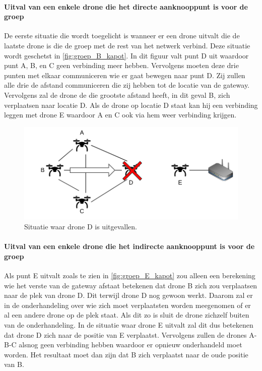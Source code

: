 \documentclass[a4paper, 11pt, oneside]{report}
\begin{document}
\paragraph{Uitval van een enkele drone die het directe aanknooppunt is voor de groep}
De eerste situatie die wordt toegelicht is wanneer er een drone uitvalt die de laatste drone is die de groep met de rest van het netwerk verbind.
Deze situatie wordt geschetst in \autoref{fig:groep_B_kapot}. 
In dit figuur valt punt D uit waardoor punt A, B, en C geen verbinding meer hebben.
Vervolgens moeten deze drie punten met elkaar communiceren wie er gaat bewegen naar punt D.
Zij zullen alle drie de afstand communiceren die zij hebben tot de locatie van de gateway. 
Vervolgens zal de drone de die grootste afstand heeft, in dit geval B, zich verplaatsen naar locatie D.
Als de drone op locatie D staat kan hij een verbinding leggen met drone E waardoor A en C ook via hem weer verbinding krijgen.

\begin{figure}[H]
	\begin{center}\includegraphics[width=.8\linewidth]{Afbeeldingen/droneopstelling_Groep_een_kapot.png}\end{center}
	\caption{Situatie waar drone D is uitgevallen.}
	\label{fig:groep_B_kapot}
\end{figure}

\paragraph{Uitval van een enkele drone die het indirecte aanknooppunt is voor de groep}
Als punt E uitvalt zoals te zien in \autoref{fig:groep_E_kapot} zou alleen een berekening wie het verste van de gateway afstaat betekenen dat drone B zich zou verplaatsen naar de plek van drone D.
Dit terwijl drone D nog gewoon werkt.
Daarom zal er in de onderhandeling over wie zich moet verplaatsten worden meegenomen of er al een andere drone op de plek staat.
Als dit zo is sluit de drone zichzelf buiten van de onderhandeling.
In de situatie waar drone E uitvalt zal dit dus betekenen dat drone D zich naar de positie van E verplaatst.
Vervolgens zullen de drones A-B-C alsnog geen verbinding hebben waardoor er opnieuw onderhandeld moet worden. 
Het resultaat moet dan zijn dat B zich verplaatst naar de oude positie van B.  
\end{document}
